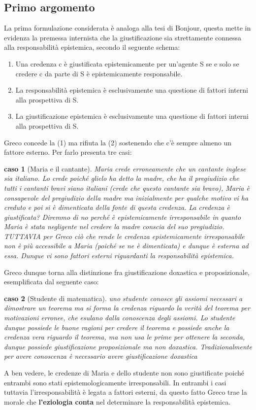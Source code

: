 \documentclass[10pt,a4paper]{article}
\newtheorem{caso}{caso}
\begin{document}
\subsection{Primo argomento}
La prima formulazione considerata è analoga alla tesi di Bonjour, questa mette in evidenza la premessa internista che la giustificazione sia strettamente connessa alla responsabilità epistemica, secondo il seguente schema:
\begin{enumerate}
	\item Una credenza c è giustificata epistemicamente per un'agente S se e solo se credere c da parte di S è epistemicamente responsabile.
	\item La responsabilità epistemica è esclusivamente una questione di fattori interni alla prospettiva di S.
	\item La giustificazione epistemica è esclusivamente una questione di fattori interni alla prospettiva di S.
\end{enumerate}
Greco concede la (1) ma rifiuta la (2) sostenendo che c'è sempre almeno un fattore esterno. Per farlo presenta tre casi:
\begin{caso}[Maria e il cantante]
	Maria crede erroneamente che un cantante inglese sia italiano. Lo crede poiché glielo ha detto la madre, che ha il pregiudizio che tutti i cantanti bravi siano italiani (crede che questo cantante sia bravo), Maria è consapevole del pregiudizio della madre ma inizialmente per qualche motivo vi ha creduto e poi si è dimenticata della fonte di questa credenza. La credenza è giustificata? Diremmo di no perché è epistemicamente irresponsabile in quanto Maria è stata negligente nel credere la madre conscia del suo pregiudizio. TUTTAVIA per Greco ciò che rende le credenza epistemicamente irresponsabile non è più accessibile a Maria (poiché se ne è dimenticata) e dunque è esterna ad essa. Dunque vi sono fattori esterni riguardanti la responsabilità epistemica. 
\end{caso}
Greco dunque torna alla distinzione fra giustificazione doxastica e proposizionale, esemplificata dal seguente caso: 
\begin{caso}[Studente di matematica]
	uno studente conosce gli assiomi necessari a dimostrare un teorema ma si forma la credenza riguardo la verità del teorema per motivazioni erronee, che esulano dalla conoscenza degli assiomi. Lo studente dunque possiede le buone ragioni per credere il teorema e possiede anche la credenza vera riguardo il teorema, ma non usa le prime per ottenere la seconda, dunque possiede giustificazione proposizionale ma non doxastica. Tradizionalmente per avere conoscenza è necessario avere giustificazione doxastica
\end{caso}
A ben vedere, le credenze di Maria e dello studente non sono giustificate poiché entrambi sono stati epistemologicamente irresponsabili. In entrambi i casi tuttavia l'irresponsabilità è legata a fattori esterni, da questo fatto Greco trae la morale che \textbf{l'eziologia conta} nel determinare la responsabilità epistemica.
\end{document}
